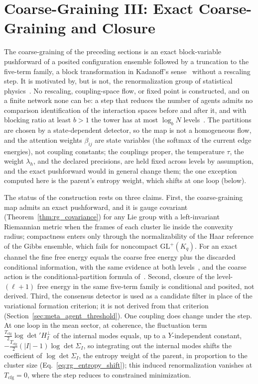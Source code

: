 \documentclass[11pt]{article}
\begin{document}
\section{Coarse-Graining III: Exact Coarse-Graining and Closure}\label{sec:rg_status}

The coarse-graining of the preceding sections is an exact block-variable pushforward of a posited configuration ensemble followed by a truncation to the five-term family, a block transformation in Kadanoff's sense~\cite{kadanoff1966scaling} without a rescaling step. It is motivated by, but is not, the renormalization group of statistical physics~\cite{Wilson1971, Wilson1974, Cardy1996}. No rescaling, coupling-space flow, or fixed point is constructed, and on a finite network none can be: a step that reduces the number of agents admits no comparison identification of the interaction spaces before and after it, and with blocking ratio at least $b > 1$ the tower has at most $\log_b N$ levels~\cite[Ch.~11, the finite-network obstruction proposition]{DennisGaugeVFE2026}. The partitions are chosen by a state-dependent detector, so the map is not a homogeneous flow, and the attention weights $\beta_{ij}$ are state variables (the softmax of the current edge energies), not coupling constants; the couplings proper, the temperature $\tau$, the weight $\lambda_h$, and the declared precisions, are held fixed across levels by assumption, and the exact pushforward would in general change them; the one exception computed here is the parent's entropy weight, which shifts at one loop (below).

The status of the construction rests on three claims. First, the coarse-graining map admits an exact pushforward, and it is gauge covariant (Theorem~\ref{thm:rg_covariance}) for any Lie group with a left-invariant Riemannian metric when the frames of each cluster lie inside the convexity radius; compactness enters only through the normalizability of the Haar reference of the Gibbs ensemble, which fails for noncompact $\mathrm{GL}^+(K_q)$. For an exact channel the fine free energy equals the coarse free energy plus the discarded conditional information, with the same evidence at both levels~\cite[Ch.~9, the exact coarse free-energy theorem]{DennisGaugeVFE2026}, and the coarse action is the conditional-partition formula of~\cite[Ch.~11]{DennisGaugeVFE2026}. Second, closure of the level-$(\ell+1)$ free energy in the same five-term family is conditional and posited, not derived. Third, the consensus detector is used as a candidate filter in place of the variational formation criterion; it is not derived from that criterion (Section~\ref{sec:meta_agent_threshold}). One coupling does change under the step. At one loop in the mean sector, at coherence, the fluctuation term $\tfrac{T_{\mathrm{cfg}}}{2}\log\det' H_I^{\perp}$ of the internal modes equals, up to a $Y$-independent constant, $-\tfrac{T_{\mathrm{cfg}}}{2}(|I|-1)\log\det\Sigma_I$, so integrating out the internal modes shifts the coefficient of $\log\det\Sigma_I$, the entropy weight of the parent, in proportion to the cluster size (Eq.~\eqref{eq:rg_entropy_shift}); this induced renormalization vanishes at $T_{\mathrm{cfg}} = 0$, where the step reduces to constrained minimization.
\end{document}

